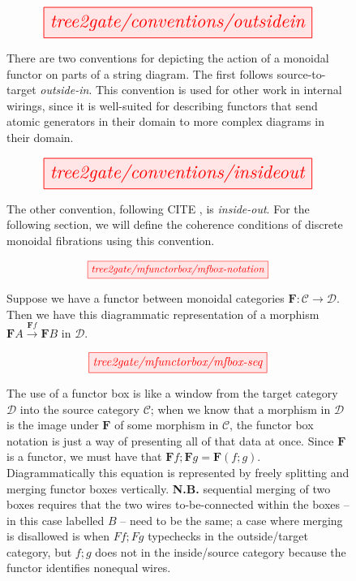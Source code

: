 \begin{figure}[h!]\label{fig:outsidein}
\centering
\[\resizebox{0.75\textwidth}{!}{\tikzfig{tree2gate/conventions/outsidein}}\]
\caption{There are two conventions for depicting the action of a monoidal functor on parts of a string diagram. The first follows source-to-target \emph{outside-in}. This convention is used for other work in internal wirings, since it is well-suited for describing functors that send atomic generators in their domain to more complex diagrams in their domain.}
\end{figure}

\begin{figure}[h!]\label{fig:insideout}
\centering
\[\resizebox{0.75\textwidth}{!}{\tikzfig{tree2gate/conventions/insideout}}\]
\caption{The other convention, following \bR CITE \e, is \emph{inside-out}. For the following section, we will define the coherence conditions of discrete monoidal fibrations using this convention.}
\end{figure}

\begin{figure}[h!]
\[\resizebox{0.5\textwidth}{!}{\tikzfig{tree2gate/mfunctorbox/mfbox-notation}}\]
\caption{Suppose we have a functor between monoidal categories $\mathbf{F}: \mathcal{C} \rightarrow \mathcal{D}$. Then we have this diagrammatic representation of a morphism $\mathbf{F}A \overset{\mathbf{F}f}{\rightarrow} \mathbf{F}B$ in $\mathcal{D}$.}
\end{figure}

\begin{figure}[h!]
\[\resizebox{0.5\textwidth}{!}{\tikzfig{tree2gate/mfunctorbox/mfbox-seq}}\]
\caption{The use of a functor box is like a window from the target category $\mathcal{D}$ into the source category $\mathcal{C}$; when we know that a morphism in $\mathcal{D}$ is the image under $\mathbf{F}$ of some morphism in $\mathcal{C}$, the functor box notation is just a way of presenting all of that data at once. Since $\mathbf{F}$ is a functor, we must have that $\mathbf{F}f ; \mathbf{F}g = \mathbf{F}(f;g)$. Diagrammatically this equation is represented by freely splitting and merging functor boxes vertically. \textbf{N.B.} sequential merging of two boxes requires that the two wires to-be-connected within the boxes -- in this case labelled $B$ -- need to be the same; a case where merging is disallowed is when $Ff;Fg$ typechecks in the outside/target category, but $f;g$ does not in the inside/source category because the functor identifies nonequal wires.}
\end{figure}

